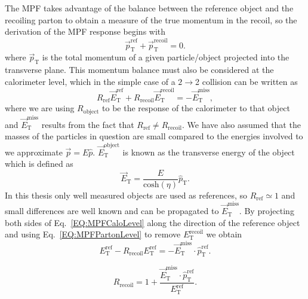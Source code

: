 The MPF takes advantage of the balance between the reference object and the recoiling parton to obtain a measure of the true momentum in the recoil, so the derivation of the MPF response begins with 
\begin{equation}
  \label{EQ:MPFPartonLevel}
  \vec{p}_{\mathrm T}^{\mathrm{ref}}+\vec{p}_{\mathrm T}^{\mathrm{recoil}} = 0.  
\end{equation}
\noindent
where $\vec{p}_{\mathrm T}$ is the total momentum of a given particle/object projected into the transverse plane.   
This momentum balance must also be considered at the calorimeter level, which in the simple case of a $2\rightarrow$2 collision can be written as
\begin{equation}
  \label{EQ:MPFCaloLevel}
  R_{\mathrm{ref}}\vec{E}_{\mathrm T}^{\mathrm{ref}}+R_{\mathrm{recoil}}\vec{E}_{\mathrm T}^{\mathrm{recoil}}=-\vec{E}_{\mathrm T}^{\mathrm{miss}},
\end{equation}
\noindent
where we are using $R_{\mathrm{object}}$ to be the response of the calorimeter to that object and $\vec{E}_{\mathrm T}^{\mathrm{miss}}$ results from the fact that $R_{\mathrm{ref}} \neq R_{\mathrm{recoil}}$.  
We have also assumed that the masses of the particles in question are small compared to the energies involved to we approximate $\vec{p}=E\hat{p}$.  
$\vec{E}_{\mathrm T}^{\mathrm{object}}$ is known as the transverse energy of the object which is defined as
\begin{equation}
  \vec{E}_{\mathrm T}=\frac{E}{\mathrm{cosh}\left(\eta\right)}\hat{p}_{\mathrm T}.  
\end{equation}
\noindent
In this thesis only well measured objects are used as references, so $R_{\mathrm{ref}}\simeq1$ and small differences are well known and can be propagated to $\vec{E}_{\mathrm T}^{\mathrm{miss}}$.  
By projecting both sides of Eq.~\ref{EQ:MPFCaloLevel} along the direction of the reference object and using Eq.~\ref{EQ:MPFPartonLevel} to remove ${E}_{\mathrm T}^{\mathrm{recoil}}$ we obtain
\begin{equation}
  E_{\mathrm T}^{\mathrm{ref}}-R_{\mathrm{recoil}}E_{\mathrm T}^{\mathrm{ref}}=-\vec{E}_{\mathrm T}^{\mathrm{miss}}\cdot\hat{p}_{\mathrm T}^{\mathrm{ref}}.
\end{equation} 

\begin{equation}
  \label{EQ:MPFSimple}
  R_{\mathrm{recoil}}=1+\frac{\vec{E}_{\mathrm T}^{\mathrm{miss}}\cdot\hat{p}_{\mathrm T}^{\mathrm{ref}}}{E_{\mathrm T}^{\mathrm{ref}}}.
\end{equation}

